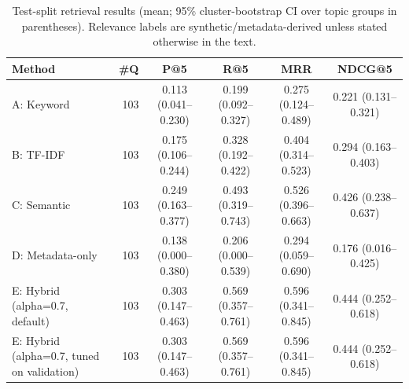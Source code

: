 \begin{table}[t]
\centering
\caption{Test-split retrieval results (mean; 95\% cluster-bootstrap CI over topic groups in parentheses). Relevance labels are synthetic/metadata-derived unless stated otherwise in the text.}
\label{tab:main}
\scriptsize
\begin{tabular}{lrcccc}
\toprule
Method & \#Q & P@5 & R@5 & MRR & NDCG@5 \\
\midrule
A: Keyword & 103 & 0.113 (0.041--0.230) & 0.199 (0.092--0.327) & 0.275 (0.124--0.489) & 0.221 (0.131--0.321) \\
B: TF-IDF & 103 & 0.175 (0.106--0.244) & 0.328 (0.192--0.422) & 0.404 (0.314--0.523) & 0.294 (0.163--0.403) \\
C: Semantic & 103 & 0.249 (0.163--0.377) & 0.493 (0.319--0.743) & 0.526 (0.396--0.663) & 0.426 (0.238--0.637) \\
D: Metadata-only & 103 & 0.138 (0.000--0.380) & 0.206 (0.000--0.539) & 0.294 (0.059--0.690) & 0.176 (0.016--0.425) \\
E: Hybrid (alpha=0.7, default) & 103 & 0.303 (0.147--0.463) & 0.569 (0.357--0.761) & 0.596 (0.341--0.845) & 0.444 (0.252--0.618) \\
E: Hybrid (alpha=0.7, tuned on validation) & 103 & 0.303 (0.147--0.463) & 0.569 (0.357--0.761) & 0.596 (0.341--0.845) & 0.444 (0.252--0.618) \\
\bottomrule
\end{tabular}
\end{table}
